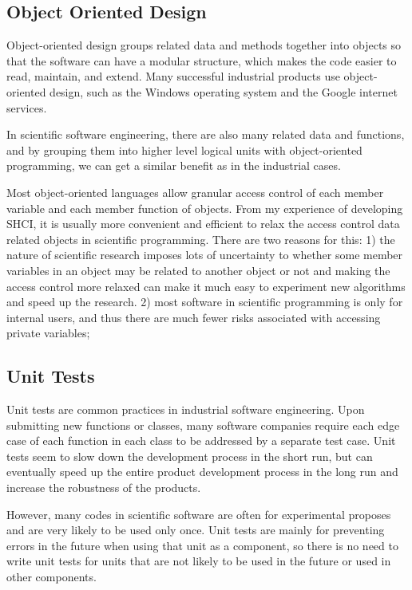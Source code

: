 \subsection{Object Oriented Design}
Object-oriented design groups related data and methods together into objects so that the software can have a modular structure, which makes the code easier to read, maintain, and extend.
Many successful industrial products use object-oriented design, such as the Windows operating system and the Google internet services.

In scientific software engineering, there are also many related data and functions, and by grouping them into higher level logical units with object-oriented programming, we can get a similar benefit as in the industrial cases.

Most object-oriented languages allow granular access control of each member variable and each member function of objects.
From my experience of developing SHCI, it is usually more convenient and efficient to relax the access control data related objects in scientific programming.
There are two reasons for this:
1) the nature of scientific research imposes lots of uncertainty to whether some member variables in an object may be related to another object or not and making the access control more relaxed can make it much easy to experiment new algorithms and speed up the research.
2) most software in scientific programming is only for internal users, and thus there are much fewer risks associated with accessing private variables;

\subsection{Unit Tests}
Unit tests are common practices in industrial software engineering.
Upon submitting new functions or classes, many software companies require each edge case of each function in each class to be addressed by a separate test case.
Unit tests seem to slow down the development process in the short run, but can eventually speed up the entire product development process in the long run and increase the robustness of the products.

However, many codes in scientific software are often for experimental proposes and are very likely to be used only once.
Unit tests are mainly for preventing errors in the future when using that unit as a component, so there is no need to write unit tests for units that are not likely to be used in the future or used in other components.

